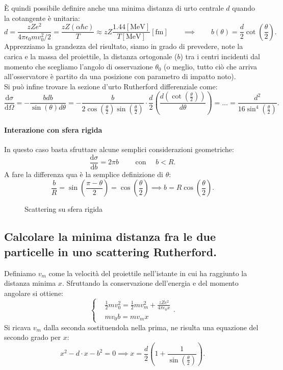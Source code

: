 È quindi possibile definire anche una minima distanza di urto centrale $d$ quando la cotangente è unitaria:
\[
	d = \frac{zZe^2}{4 \pi \epsilon_0 m  v_0^2 /2} = \frac{zZ\left( \alpha \hbar c \right)}{T} \approx zZ \frac{1.44[\text{MeV}]}{T[\text{MeV}]} [\text{fm}]
	\quad \quad \implies \quad \quad b\left( \theta \right) = \frac{d}{2} \cot\left( \frac{\theta}{2} \right) 
.\] \label{eq:d-rutherford}
Apprezziamo la grandezza del risultato, siamo in grado di prevedere, note la carica e la massa del proiettile, la distanza ortogonale ($b$) tra i centri incidenti dal momento che scegliamo l'angolo di osservazione $\theta_0$ (o meglio, tutto ciò che arriva all'osservatore è partito da una posizione con parametro di impatto noto).\\
Si può infine trovare la sezione d'urto Rutherford differenziale come:
\[
	\frac{\mbox{d} \sigma}{\mbox{d} \Omega} = -\frac{b db}{\sin\left( \theta \right) d \theta} =
	-\frac{b}{2 \cos\left( \frac{\theta}{2} \right) \sin\left( \frac{\theta}{2} \right)} \cdot \frac{d}{2}\left( \frac{d \left( \cot\left( \frac{\theta}{2} \right)\right)}{d \theta} \right) = 
	\ldots = \frac{d^2}{16 \sin^{4}\left( \frac{\theta}{2} \right) } 
.\] 

\paragraph{Interazione con sfera rigida}
In questo caso basta sfruttare alcune semplici considerazioni geometriche:
\[
	\frac{\text{d}\sigma}{\text{d} b} = 2 \pi b \quad \quad \text{ con } \quad b<R 
.\] 
A fare la differenza qua è la semplice definizione di $\theta$:
\[
	\frac{b}{R} = \sin\left( \frac{\pi - \theta}{2} \right) = \cos\left( \frac{\theta}{2} \right)  \implies b = R \cos\left( \frac{\theta}{2} \right) 
.\] 
\begin{figure}[H]
    \centering
    \caption{Scattering su sfera rigida}
    \label{fig:scattering-su-sfera-rigida}
\end{figure}

\subsection[\hspace{2mm} Minima distanza d tra particelle nello scattering Rutherford]{Calcolare la minima distanza fra le due particelle in uno scattering Rutherford.}
Definiamo $v_m$ come la velocità del proiettile nell'istante in cui ha raggiunto la distanza minima $x$. Sfruttando la conservazione dell'energia e del momento angolare si ottiene:
\[
	\begin{cases}
		&\frac{1}{2}m v_0^2 = \frac{1}{2} m v_m^2 + \frac{zZe^2}{4 \pi \epsilon_0 x}\\
		&mv_0b = m v_m x
	\end{cases}
.\]
Si ricava $v_m$ dalla seconda sostituendola nella prima, ne risulta una equazione del secondo grado per $x$:
 \[
	 x^2 - d \cdot x - b^2 = 0 \implies x = \frac{d}{2} \left( 1 + \frac{1}{\sin\left( \frac{\theta}{2} \right) } \right) 
.\] 
